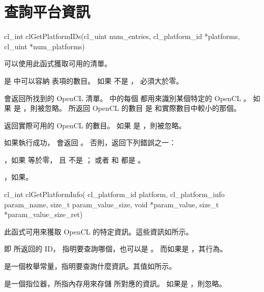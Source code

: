 \section[sec:queryPlf]{查詢平台資訊}


\startCLFUNC
cl_int clGetPlatformIDs(cl_uint num_entries,
			cl_platform_id *platforms,
			cl_uint *num_platforms)
\stopCLFUNC

可以使用此函式獲取可用的清單。

 是  中可以容納  表項的數目。
如果  不是 ，  必須大於零。

 會返回所找到的 OpenCL  清單。
 中的每個 
都用來識別某個特定的 OpenCL 。
如果  是 ，則被忽略。
所返回 OpenCL  的數目 是  和實際數目中較小的那個。

 返回實際可用的 OpenCL  的數目。
如果  是 ，則被忽略。

如果執行成功， 會返回 。
否則，返回下列錯誤之一：
\startigBase
\item {}，如果  等於零，
且  不是 ；
或者  和  都是 。

\item {}，如果\schostfailres。
\stopigBase


\startCLFUNC
cl_int clGetPlatformInfo(
		cl_platform_id platform,
		cl_platform_info param_name,
		size_t param_value_size,
		void *param_value,
		size_t *param_value_size_ret)
\stopCLFUNC

此函式可用來獲取 OpenCL 的特定資訊。這些資訊如所示。

 即  所返回的 ID，
指明要查詢哪個，也可以是 。
而如果是 ，其行為。

 是一個枚舉常量，指明要查詢什麼資訊。其值如所示。

 是一個指位器，所指內存用來存儲  所對應的資訊。
如果是 ，則忽略。

